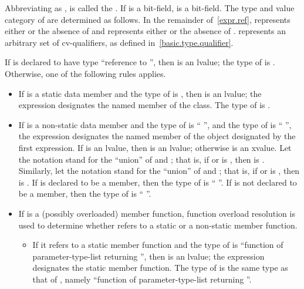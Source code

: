 \pnum
Abbreviating 
as ,
 is called the .
If  is a bit-field,  is a bit-field. The
type and value category of  are determined as follows.
In the remainder of~\ref{expr.ref},  represents either
 or the absence of  and  represents
either  or the absence of . 
represents an arbitrary set of cv-qualifiers, as defined
in~\ref{basic.type.qualifier}.

\pnum
If  is declared to have type ``reference to '', then
 is an lvalue; the type of  is .
Otherwise, one of the following rules applies.

\begin{itemize}
\item If  is a static data member and the type of 
is , then  is an lvalue; the expression designates
the named member of the class. The type of  is .

\item If  is a non-static data member and the type of
 is `` '', and the type of 
is `` '', the expression designates the named
member of the object designated by the first expression. If 
is an lvalue, then  is an lvalue;
otherwise  is an xvalue.
Let the notation  stand for the ``union'' of
 and ; that is, if  or 
is , then  is . Similarly,
let the notation  stand for the ``union'' of 
and ; that is, if  or  is
, then  is . If  is
declared to be a  member, then the type of 
is `` ''. If  is not declared to be a
 member, then the type of  is
``  ''.

\item If  is a (possibly overloaded) member function, function
overload resolution is used to determine whether
 refers to a static or a non-static member function.

\begin{itemize}
\item If it refers to a static member function and the type of
 is ``function of parameter-type-list returning '',
then  is an lvalue; the expression designates the static
member function. The type of  is the same type as that of
, namely ``function of parameter-type-list returning
''.


\end{itemize}
\end{itemize}
